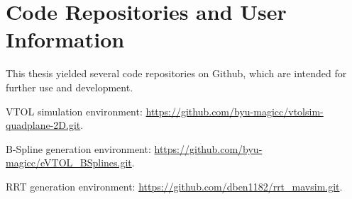 \section{Code Repositories and User Information}

This thesis yielded several code repositories on Github, which are intended for further use and development. 

VTOL simulation environment: \href{https://github.com/byu-magicc/vtolsim-quadplane-2D.git}{https://github.com/byu-magicc/vtolsim-quadplane-2D.git}.

B-Spline generation environment: \href{https://github.com/byu-magicc/eVTOL_BSplines.git}{https://github.com/byu-magicc/eVTOL\_BSplines.git}.

RRT generation environment: \href{https://github.com/dben1182/rrt_mavsim.git}{https://github.com/dben1182/rrt\_mavsim.git}.
